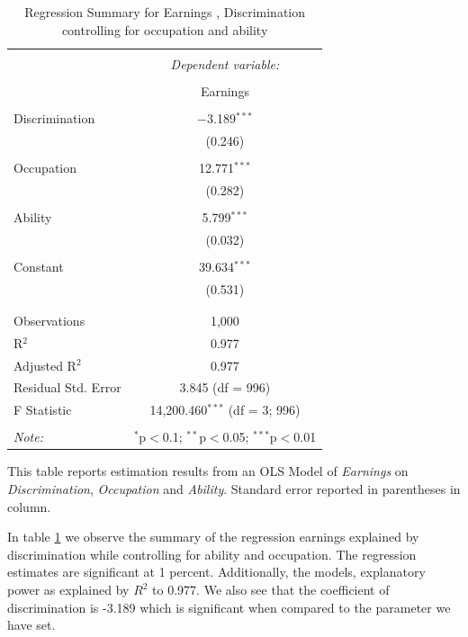 \documentclass[a4paper,12pt,oneside,English]{article}
\begin{document}
\begin{table}[!htbp] \centering 
  \caption{Regression Summary for Earnings , Discrimination controlling for occupation and ability} 
  \label{reg table 3}
  \begin{threeparttable}
  \begin{tabular}{@{\extracolsep{5pt}}lc} 
\\[-1.8ex]\hline 
\hline \\[-1.8ex] 
 & \multicolumn{1}{c}{\textit{Dependent variable:}} \\ 
\cline{2-2} 
\\[-1.8ex] & Earnings \\ 
\hline \\[-1.8ex] 
 Discrimination & $-$3.189$^{***}$ \\ 
  & (0.246) \\ 
  & \\ 
 Occupation & 12.771$^{***}$ \\ 
  & (0.282) \\ 
  & \\ 
 Ability & 5.799$^{***}$ \\ 
  & (0.032) \\ 
  & \\ 
 Constant & 39.634$^{***}$ \\ 
  & (0.531) \\ 
  & \\ 
\hline \\[-1.8ex] 
Observations & 1,000 \\ 
R$^{2}$ & 0.977 \\ 
Adjusted R$^{2}$ & 0.977 \\ 
Residual Std. Error & 3.845 (df = 996) \\ 
F Statistic & 14,200.460$^{***}$ (df = 3; 996) \\ 
\hline 
\hline \\[-1.8ex] 
\textit{Note:}  & \multicolumn{1}{r}{$^{*}$p$<$0.1; $^{**}$p$<$0.05; $^{***}$p$<$0.01} \\ 
\end{tabular}
\hfill\parbox[t]{0.5\textwidth}{This table reports estimation results from an OLS Model of \textit{Earnings} on \textit{Discrimination}, \textit{Occupation} and \textit{Ability}. Standard error reported in parentheses in column.}
\end{threeparttable}
\end{table}
In table \ref{reg table 3} we observe the summary of the regression earnings explained by discrimination while controlling for ability and occupation. The regression estimates are significant at 1 percent. Additionally, the models, explanatory power as explained by $R^2$ to 0.977. We also see that the coefficient of discrimination is -3.189 which is significant when compared to the parameter we have set.
\end{document}
